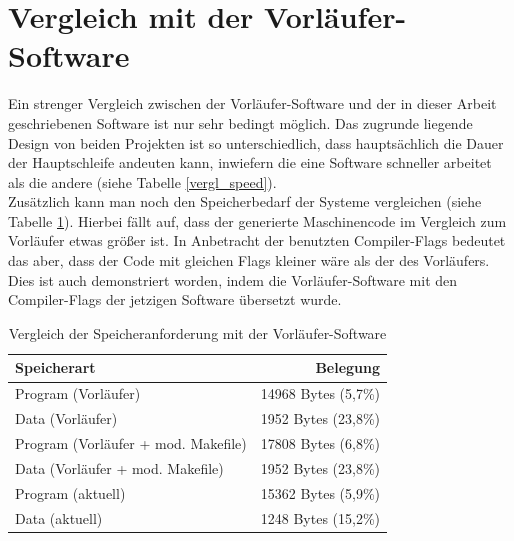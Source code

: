 \section{Vergleich mit der Vorläufer-Software}
Ein strenger Vergleich zwischen der Vorläufer-Software und der in dieser Arbeit geschriebenen Software ist
nur sehr bedingt möglich. Das zugrunde liegende Design von beiden Projekten ist so unterschiedlich, dass hauptsächlich
die Dauer der Hauptschleife andeuten kann, inwiefern die eine Software schneller arbeitet als die andere
(siehe Tabelle \ref{vergl_speed}).\\
Zusätzlich kann man noch den Speicherbedarf der Systeme vergleichen (siehe Tabelle \ref{vergl_speicher}). Hierbei
fällt auf, dass der generierte Maschinencode im Vergleich zum Vorläufer etwas größer ist. In Anbetracht
der benutzten Compiler-Flags bedeutet das aber, dass der Code mit gleichen Flags kleiner wäre als der des Vorläufers. Dies ist
auch demonstriert worden, indem die Vorläufer-Software mit den Compiler-Flags der jetzigen Software übersetzt
wurde.
\begin{table}[htb]
\begin{center}
	\begin{tabular}{|l||r|}
		\hline
		\textbf{Speicherart} & \textbf{Belegung} \\ \hline \hline
		Program (Vorläufer) & 14968 Bytes (5,7\%)  \\ \hline
		Data (Vorläufer)& 1952 Bytes (23,8\%) \\ \hline \hline
		Program (Vorläufer + mod. Makefile) & 17808 Bytes (6,8\%)  \\ \hline
		Data (Vorläufer + mod. Makefile) & 1952 Bytes (23,8\%) \\ \hline \hline
		Program (aktuell)& 15362 Bytes (5,9\%) \\ \hline
		Data (aktuell)& 1248 Bytes (15,2\%) \\ \hline
	\end{tabular}
	\caption{\label{vergl_speicher} Vergleich der Speicheranforderung mit der Vorläufer-Software}
\end{center}
\end{table}
